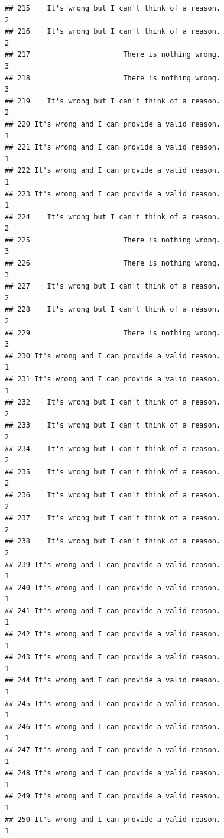 \documentclass[
  american,
  man,floatsintext]{apa7}
\begin{document}
\begin{verbatim}
## 215    It's wrong but I can't think of a reason.                    2
## 216    It's wrong but I can't think of a reason.                    2
## 217                      There is nothing wrong.                    3
## 218                      There is nothing wrong.                    3
## 219    It's wrong but I can't think of a reason.                    2
## 220 It's wrong and I can provide a valid reason.                    1
## 221 It's wrong and I can provide a valid reason.                    1
## 222 It's wrong and I can provide a valid reason.                    1
## 223 It's wrong and I can provide a valid reason.                    1
## 224    It's wrong but I can't think of a reason.                    2
## 225                      There is nothing wrong.                    3
## 226                      There is nothing wrong.                    3
## 227    It's wrong but I can't think of a reason.                    2
## 228    It's wrong but I can't think of a reason.                    2
## 229                      There is nothing wrong.                    3
## 230 It's wrong and I can provide a valid reason.                    1
## 231 It's wrong and I can provide a valid reason.                    1
## 232    It's wrong but I can't think of a reason.                    2
## 233    It's wrong but I can't think of a reason.                    2
## 234    It's wrong but I can't think of a reason.                    2
## 235    It's wrong but I can't think of a reason.                    2
## 236    It's wrong but I can't think of a reason.                    2
## 237    It's wrong but I can't think of a reason.                    2
## 238    It's wrong but I can't think of a reason.                    2
## 239 It's wrong and I can provide a valid reason.                    1
## 240 It's wrong and I can provide a valid reason.                    1
## 241 It's wrong and I can provide a valid reason.                    1
## 242 It's wrong and I can provide a valid reason.                    1
## 243 It's wrong and I can provide a valid reason.                    1
## 244 It's wrong and I can provide a valid reason.                    1
## 245 It's wrong and I can provide a valid reason.                    1
## 246 It's wrong and I can provide a valid reason.                    1
## 247 It's wrong and I can provide a valid reason.                    1
## 248 It's wrong and I can provide a valid reason.                    1
## 249 It's wrong and I can provide a valid reason.                    1
## 250 It's wrong and I can provide a valid reason.                    1

\end{verbatim}
\end{document}
